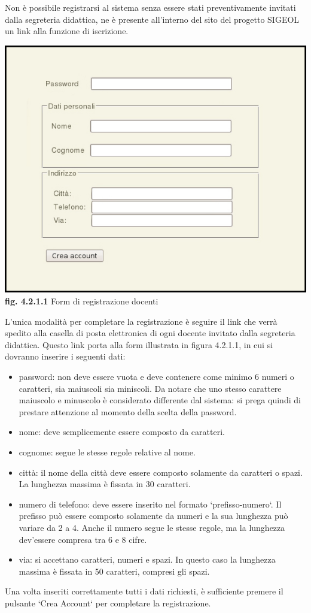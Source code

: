 \documentclass[11pt,a4paper]{article}
\begin{document}
Non è possibile registrarsi al sistema senza essere stati preventivamente invitati dalla segreteria didattica, ne è presente all'interno del sito del progetto SIGEOL un link alla funzione di iscrizione.

\begin{center}
	\includegraphics[scale=0.5]{images/registrazione_docente.jpg}\\ 
	\textbf{fig. 4.2.1.1} Form di registrazione docenti\\
\end{center}

L'unica modalità per completare la registrazione è seguire il link che verrà spedito alla casella di posta elettronica di ogni docente invitato dalla segreteria didattica. Questo link porta alla form illustrata in figura 4.2.1.1, in cui si dovranno inserire i seguenti dati:
\begin{itemize}
 \item password: non deve essere vuota e deve contenere come minimo 6 numeri o caratteri, sia maiuscoli sia miniscoli. Da notare che uno stesso carattere maiuscolo e minuscolo è considerato differente dal sistema: si prega quindi di prestare attenzione al momento della scelta della password.
 \item nome: deve semplicemente essere composto da caratteri.
 \item cognome: segue le stesse regole relative al nome.
 \item città: il nome della città deve essere composto solamente da caratteri o spazi. La lunghezza massima è fissata in 30 caratteri.
 \item numero di telefono: deve essere inserito nel formato `prefisso-numero`. Il prefisso può essere composto solamente da numeri e la sua lunghezza può variare da 2 a 4. Anche il numero segue le stesse regole, ma la lunghezza dev'essere compresa tra 6 e 8 cifre.
 \item via: si accettano caratteri, numeri e spazi. In questo caso la lunghezza massima è fissata in 50 caratteri, compresi gli spazi.
\end{itemize}
Una volta inseriti correttamente tutti i dati richiesti, è sufficiente premere il pulsante `Crea Account` per completare la registrazione.
\end{document}
